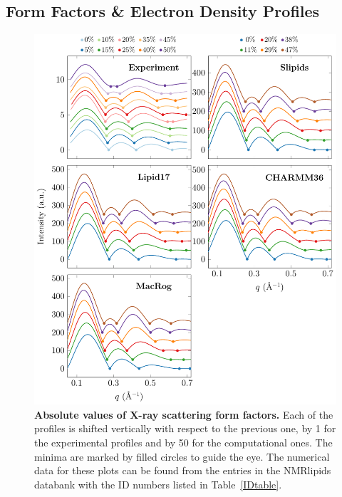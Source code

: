 \documentclass[journal=jpcbfk,manuscript=suppinfo]{achemso}
\begin{document}
\clearpage

\subsection{Form Factors \& Electron Density Profiles}

\begin{figure}[htb!]
    \centering
    \includegraphics[width=0.86\linewidth]{../FIGS/scattering.pdf}
    \caption{\label{SIfig:scattering}%
     \textbf{Absolute values of X-ray scattering form factors.} Each of the profiles is shifted vertically with respect to the previous one, by 1 for the experimental profiles and by 50 for the computational ones. The minima are marked by filled circles to guide the eye. The numerical data for these plots can be found from the entries in the NMRlipids databank with the ID numbers listed in Table~\ref{IDtable}.
    }
\end{figure}
\end{document}
